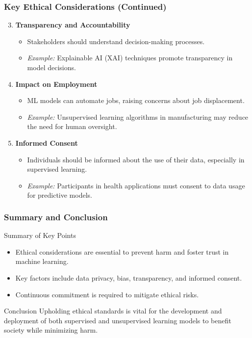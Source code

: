 \documentclass[aspectratio=169]{beamer}
\begin{document}
\begin{frame}[fragile]
    \frametitle{Key Ethical Considerations (Continued)}
    \begin{enumerate}
        \setcounter{enumi}{2} %
        \item \textbf{Transparency and Accountability}
            \begin{itemize}
                \item Stakeholders should understand decision-making processes.
                \item \textit{Example:} Explainable AI (XAI) techniques promote transparency in model decisions.
            \end{itemize}
        \item \textbf{Impact on Employment}
            \begin{itemize}
                \item ML models can automate jobs, raising concerns about job displacement.
                \item \textit{Example:} Unsupervised learning algorithms in manufacturing may reduce the need for human oversight.
            \end{itemize}
        \item \textbf{Informed Consent}
            \begin{itemize}
                \item Individuals should be informed about the use of their data, especially in supervised learning.
                \item \textit{Example:} Participants in health applications must consent to data usage for predictive models.
            \end{itemize}
    \end{enumerate}
\end{frame}

\begin{frame}[fragile]
    \frametitle{Summary and Conclusion}
    \begin{block}{Summary of Key Points}
        \begin{itemize}
            \item Ethical considerations are essential to prevent harm and foster trust in machine learning.
            \item Key factors include data privacy, bias, transparency, and informed consent.
            \item Continuous commitment is required to mitigate ethical risks.
        \end{itemize}
    \end{block}

    \begin{block}{Conclusion}
        Upholding ethical standards is vital for the development and deployment of both supervised and unsupervised learning models to benefit society while minimizing harm.
    \end{block}
\end{frame}
\end{document}
